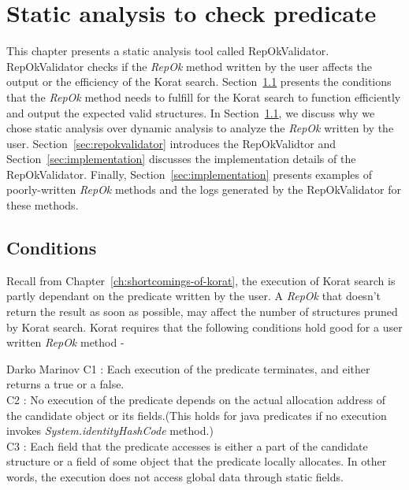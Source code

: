 \chapter{Static analysis to check predicate}
\label{ch:static-analysis}
This chapter presents a static analysis tool called
RepOkValidator. RepOkValidator checks if the \emph{RepOk} method
written by the user affects the output or the efficiency of the Korat
search. Section~\ref{sec:static-analysis-conditions} presents the
conditions that the \emph{RepOk} method needs to fulfill for the
Korat search to function efficiently and output the expected valid
structures. In Section~\ref{sec:static-analysis-conditions}, we
discuss why we chose static analysis over dynamic analysis to analyze
the \emph{RepOk} written by the user. Section~\ref{sec:repokvalidator}
introduces the RepOkValidtor and Section~\ref{sec:implementation}
discusses the implementation details of the RepOkValidator. Finally,
Section~\ref{sec:implementation} presents examples of poorly-written
\emph{RepOk} methods and the logs generated by the RepOkValidator for
these methods.


\section{Conditions}
\label{sec:static-analysis-conditions}
Recall from Chapter~\ref{ch:shortcomings-of-korat}, the execution of
Korat search is partly dependant on the predicate written by the
user. A \emph{RepOk} that doesn’t return the result as soon as
possible, may affect the number of structures pruned by Korat
search. Korat requires\cite{marinov2005automatic} that the following
conditions hold good for a user written \emph{RepOk} method -

\begin{aquote}{Darko Marinov}
C1 : Each execution of the predicate terminates, and either returns a
true or a false.\\ C2 : No execution of the predicate depends on the
actual allocation address of the candidate object or its fields.(This
holds for java predicates if no execution invokes
\emph{System.identityHashCode} method.)\\ C3 : Each field that the
predicate accesses is either a part of the candidate structure or a
field of some object that the predicate locally allocates. In other
words, the execution does not access global data through static
fields.\\
\end{aquote}

